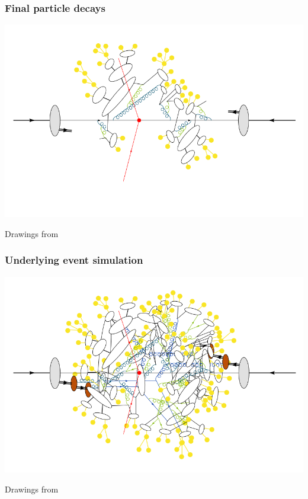 \documentclass[xcolor=dvipsnames,10pt]{beamer}
\begin{document}
\begin{frame}\frametitle{Final particle decays}
\centering\myskip
\includegraphics[height=0.8\textheight]{../montecarlo/figures/event6}

\begin{flushright}\tiny Drawings from~\cite{Gieseke}\end{flushright}

\end{frame}

\begin{frame}\frametitle{Underlying event simulation}
\centering\myskip
\includegraphics[height=0.8\textheight]{../montecarlo/figures/event7}

\begin{flushright}\tiny Drawings from~\cite{Gieseke}\end{flushright}

\end{frame}
\end{document}
